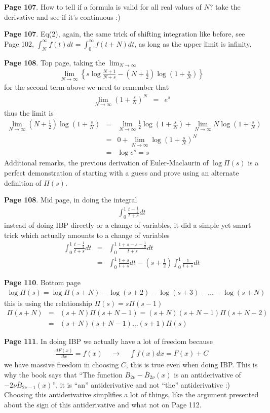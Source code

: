 \documentclass[aps,preprint,preprintnumbers,nofootinbib,showpacs,prd]{revtex4-1}
\newcommand{\nbea}{\begin{eqnarray*}}
\newcommand{\neea}{\end{eqnarray*}}
\begin{document}
{\bf Page 107}. How to tell if a formula is valid for all real values of $N$? take the derivative and see if it's continuous :)

{\bf Page 107}. Eq(2), again, the same trick of shifting integration like before, see Page 102,  $\int_N^\infty f(t) dt = \int_0^\infty f(t+N) dt$, as long as the upper limit is infinity.

{\bf Page 108}. Top page, taking the $\lim_{N\to\infty}$
%
\nbea
\lim_{N\to\infty} \left\{ s \log \frac{N+1}{N+s} - (N + \tfrac{1}{2})\log(1 + \tfrac{s}{N}) \right \}
\neea
%
for the second term above we need to remember that
%
\nbea
\lim_{N\to\infty} (1 + \tfrac{s}{N})^N & = & e^s
\neea
%
thus the limit is
%
\nbea
\lim_{N\to\infty} (N + \tfrac{1}{2})\log(1 + \tfrac{s}{N}) & = & \lim_{N\to\infty}\tfrac{1}{2}\log(1 + \tfrac{s}{N}) + \lim_{N\to\infty} N \log(1 + \tfrac{s}{N}) \\
& = & 0 + \lim_{N\to\infty} \log(1 + \tfrac{s}{N})^N \\
& = & \log e^s = s
\neea
%
Additional remarks, the previous derivation of Euler-Maclaurin of $\log\Pi(s)$ is a perfect demonstration of starting with a guess and prove using an alternate definition of $\Pi(s)$.

{\bf Page 108}. Mid page, in doing the integral
%
\nbea
\int_0^1 \frac{t - \frac{1}{2}}{t + s} dt
\neea
%
instead of doing IBP directly or a change of variables, it did a simple yet smart trick which actually amounts to a change of variables
%
\nbea
\int_0^1 \frac{t - \frac{1}{2}}{t + s} dt & = & \int_0^1 \frac{t +s - s - \frac{1}{2}}{t + s} dt \\
& = & \int_0^1 \frac{t + s}{t + s} dt - (s + \frac{1}{2})\int_0^1 \frac{1}{t + s} dt
\neea
%

{\bf Page 110}. Bottom page
%
\nbea
\log \Pi(s) = \log \Pi(s + N) - \log(s + 2) - \log(s + 3) - \dots - \log(s + N)
\neea
%
this is using the relationship $\Pi(s) = s\Pi(s - 1)$
%
\nbea
\Pi(s + N) & = & (s + N)\Pi(s + N - 1) = (s + N) (s + N - 1)\Pi(s + N - 2) \\
& = &  (s + N) (s + N - 1) \dots (s + 1) \Pi(s)
\neea
%

{\bf Page 111}. In doing IBP we actually have a lot of freedom because
%
\nbea
\frac{dF(x)}{dx} = f(x) ~~~~~\longrightarrow ~~~~~ \int f(x) dx = F(x) + C
\neea
%
we have massive freedom in choosing $C$, this is true even when doing IBP. This is why the book says that ``The function $B_{2\nu} - \overline{B}_{2\nu}(x)$ is an antiderivative of $-2\nu\overline{B}_{2\nu-1}(x)$'', it is ``an'' antiderivative and not ``the'' antiderivative :) Choosing this antiderivative simplifies a lot of things, like the argument presented about the sign of this antiderivative and what not on Page 112.
\end{document}
